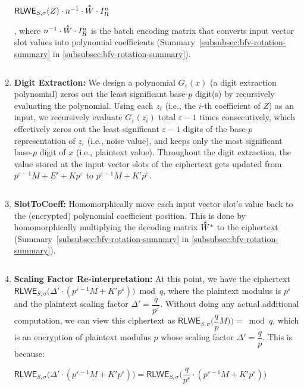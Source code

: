 \begin{enumerate}
$\textsf{RLWE}_{S, \sigma}(Z) \cdot n^{-1}\cdot \hathat{W}\cdot I_R^n$

, where $n^{-1}\cdot \hathat{W}\cdot I_R^n$ is the batch encoding matrix that converts input vector slot values into polynomial coefficients (Summary~\ref*{subsubsec:bfv-rotation-summary} in \autoref{subsubsec:bfv-rotation-summary}). 

$ $

\item \textbf{Digit Extraction:} We design a polynomial $G_\varepsilon(x)$ (a digit extraction polynomial) zeros out the least significant base-$p$  digit(s) by recursively evaluating the polynomial. Using each $z_i$ (i.e., the $i$-th coefficient of $Z$) as an input, we recursively evaluate $G_\varepsilon(z_i)$ total $\varepsilon-1$ times consecutively, which effectively zeros out the least significant $\varepsilon-1$ digits of the base-$p$ representation of $z_i$ (i.e., noise value), and keeps only the most significant base-$p$ digit of $x$ (i.e., plaintext value). Throughout the digit extraction, the value stored at the input vector slots of the ciphertext gets updated from $p^{\varepsilon-1} M  + E' + Kp^\varepsilon$ to $p^{\varepsilon-1}M  + K'p^\varepsilon$. 


$ $


\item \textbf{\textsf{SlotToCoeff}:} Homomorphically move each input vector slot's value back to the (encrypted) polynomial coefficient position. This is done by homomorphically multiplying the decoding matrix $\hathat{W}^*$ to the ciphertext (Summary~\ref*{subsubsec:bfv-rotation-summary} in \autoref{subsubsec:bfv-rotation-summary}).


$ $


\item \textbf{Scaling Factor Re-interpretation:} At this point, we have the ciphertext $\textsf{RLWE}_{S, \sigma}\bm(\Delta' \cdot (p^{\varepsilon-1}M + K'p^\varepsilon)\bm) \bmod q$, where the plaintext modulus is $p^\varepsilon$ and the plaintext scaling factor $\Delta' = \dfrac{q}{p^\varepsilon}$. Without doing any actual additional computation, we can view this ciphertext as $\textsf{RLWE}_{S, \sigma}\bm(\dfrac{q}{p}M)\bm) = \bmod q$, which is an encryption of plaintext modulus $p$ whose scaling factor $\Delta' = \dfrac{q}{p}$. This is because:

$\textsf{RLWE}_{S, \sigma}\bm(\Delta' \cdot (p^{\varepsilon-1}M + K'p^\varepsilon) \bm) = \textsf{RLWE}_{S, \sigma}\bm{\Big(}\dfrac{q}{p^\varepsilon} \cdot (p^{\varepsilon-1}M + K'p^\varepsilon) \bm{\Big)}$


\end{enumerate}
